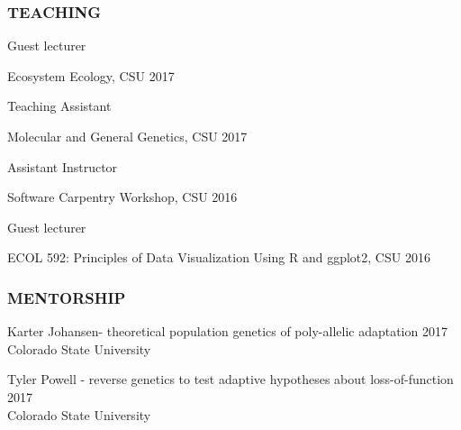 \documentclass[12pt,english]{article}
\begin{document}
\subsubsection*{TEACHING}
\vspace{-0.5ex}\par
\hspace*{1.0em} Guest lecturer
\par
\hspace*{2.0em} Ecosystem Ecology, CSU
\hfill 
2017
\par
\vspace{0.5em}
\hspace*{1.0em} Teaching Assistant 
\par
\hspace*{2.0em} Molecular and General Genetics, CSU
\hfill 
2017
\par
\vspace{0.5em}
\hspace*{1.0em} Assistant Instructor
\par
\hspace*{2.0em} Software Carpentry Workshop, CSU
\hfill 
2016
\par
\vspace{0.5em}
\hspace*{1.0em} Guest lecturer
\par
\hspace*{2.0em} ECOL 592: Principles of Data Visualization Using R and ggplot2, CSU
\hfill 
2016
\vspace{0.5em}\par


\subsubsection*{MENTORSHIP}
\vspace{-0.5ex}\par

\hspace*{1.0em} Karter Johansen-  theoretical population genetics of poly-allelic adaptation  
\hfill 
2017\\
\hspace*{2.0em} Colorado State University

\hspace*{1.0em} Tyler Powell -  reverse genetics to test adaptive hypotheses about loss-of-function  
\hfill 
2017\\
\hspace*{2.0em} Colorado State University
\end{document}

